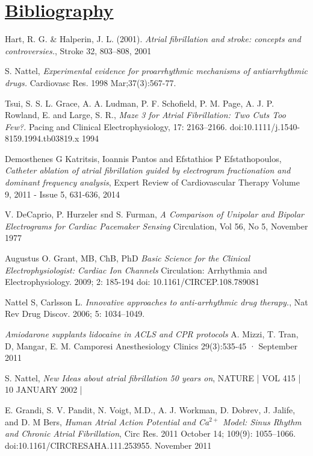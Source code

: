 \documentclass[twocolumn]{article}
\begin{document}
\section{\textbf{\underline{Bibliography}}}
\begin{thebibliography}{7}

Hart, R. G. \& Halperin, J. L. (2001).
\emph{Atrial fibrillation and stroke: concepts and controversies.},
Stroke 32, 803–808,
2001

S. Nattel, 
\emph{ Experimental evidence for proarrhythmic mechanisms of antiarrhythmic drugs.}
Cardiovasc Res. 1998 Mar;37(3):567-77.

Tsui, S. S. L. Grace, A. A. Ludman, P. F. Schofield, P. M. Page, A. J. P. Rowland, E.  and Large, S. R., 
\emph{ Maze 3 for Atrial Fibrillation: Two Cuts Too Few?.}
 Pacing and Clinical Electrophysiology,
17: 2163–2166. doi:10.1111/j.1540-8159.1994.tb03819.x
1994


Demosthenes G Katritsis, Ioannis Pantos and Efstathios P Efstathopoulos, 
\emph{Catheter ablation of atrial fibrillation guided by electrogram fractionation and dominant frequency analysis},
Expert Review of Cardiovascular Therapy 
Volume 9, 2011 - Issue 5, 631-636, 2014


V. DeCaprio, P. Hurzeler snd S. Furman, 
\emph{A Comparison of Unipolar and Bipolar Electrograms for Cardiac Pacemaker Sensing}
Circulation, Vol 56, No 5, November 1977
 

Augustus O. Grant, MB, ChB, PhD
\emph{Basic Science for the Clinical Electrophysiologist: Cardiac Ion Channels}
Circulation: Arrhythmia and Electrophysiology.
2009; 2: 185-194
doi: 10.1161/CIRCEP.108.789081

Nattel S, Carlsson L.
\emph{ Innovative approaches to anti-arrhythmic drug therapy.},
Nat Rev Drug Discov. 2006; 5: 1034–1049. 


\emph{Amiodarone supplants lidocaine in ACLS and CPR protocols}
A. Mizzi, T. Tran, D, Mangar, E. M. Camporesi
Anesthesiology Clinics 29(3):535-45 · September 2011


S. Nattel, 
\emph{New Ideas about atrial fibrillation 50 years on},
 NATURE | VOL 415 | 10 JANUARY 2002 |

E. Grandi, S. V. Pandit, N. Voigt, M.D., A. J. Workman, D. Dobrev, J. Jalife, and D. M  Bers,
\emph{Human Atrial Action Potential and Ca$^{2+ }$ Model: Sinus Rhythm and Chronic Atrial Fibrillation},
Circ Res. 2011 October 14; 109(9): 1055–1066. doi:10.1161/CIRCRESAHA.111.253955.
November 2011


\end{thebibliography}
\end{document}

